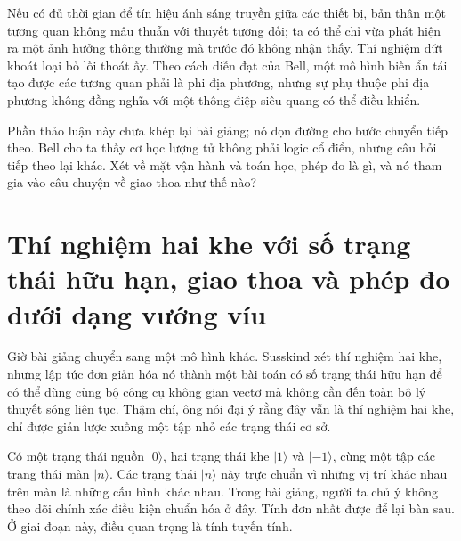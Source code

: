 Nếu có đủ thời gian để tín hiệu ánh sáng truyền giữa các thiết bị, bản thân một tương quan không mâu thuẫn với thuyết tương đối; ta có thể chỉ vừa phát hiện ra một ảnh hưởng thông thường mà trước đó không nhận thấy. Thí nghiệm dứt khoát loại bỏ lối thoát ấy. Theo cách diễn đạt của Bell, một mô hình biến ẩn tái tạo được các tương quan phải là phi địa phương, nhưng sự phụ thuộc phi địa phương không đồng nghĩa với một thông điệp siêu quang có thể điều khiển.

\begin{classroomqa}
\end{classroomqa}

Phần thảo luận này chưa khép lại bài giảng; nó dọn đường cho bước chuyển tiếp theo. Bell cho ta thấy cơ học lượng tử không phải logic cổ điển, nhưng câu hỏi tiếp theo lại khác. Xét về mặt vận hành và toán học, phép đo là gì, và nó tham gia vào câu chuyện về giao thoa như thế nào?

\section{Thí nghiệm hai khe với số trạng thái hữu hạn, giao thoa và phép đo dưới dạng vướng víu}

Giờ bài giảng chuyển sang một mô hình khác. Susskind xét thí nghiệm hai khe, nhưng lập tức đơn giản hóa nó thành một bài toán có số trạng thái hữu hạn để có thể dùng cùng bộ công cụ không gian vectơ mà không cần đến toàn bộ lý thuyết sóng liên tục. Thậm chí, ông nói đại ý rằng đây vẫn là thí nghiệm hai khe, chỉ được giản lược xuống một tập nhỏ các trạng thái cơ sở.

Có một trạng thái nguồn \(|0\rangle\), hai trạng thái khe \(|1\rangle\) và \(|-1\rangle\), cùng một tập các trạng thái màn \(|n\rangle\). Các trạng thái \(|n\rangle\) này trực chuẩn vì những vị trí khác nhau trên màn là những cấu hình khác nhau. Trong bài giảng, người ta chủ ý không theo dõi chính xác điều kiện chuẩn hóa ở đây. Tính đơn nhất được để lại bàn sau. Ở giai đoạn này, điều quan trọng là tính tuyến tính.

